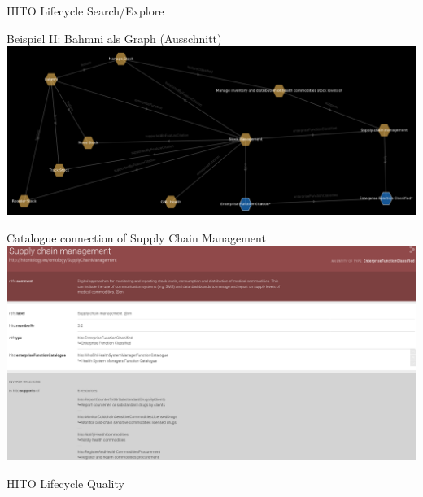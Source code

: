 \documentclass[aspectratio=1610,12pt]{beamer}
\begin{document}
\begin{frame}{HITO Lifecycle Search/Explore}
  \centering
  \vspace{-0.5cm}
\end{frame}

\begin{frame}{Beispiel II: Bahmni als Graph (Ausschnitt)}
  \includegraphics[width=\textwidth, height=.65\textheight]{img/bahmni_star.png}
\end{frame}

\begin{frame}{Catalogue connection of Supply Chain Management}
  \includegraphics[width=\textwidth]{img/supplychainmanagement.png}
\end{frame}

\begin{frame}{HITO Lifecycle Quality}
  \centering
  \vspace{-0.5cm}
\end{frame}
\end{document}
